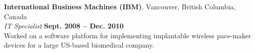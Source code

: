 \documentclass[margin,line,letterpaper]{resume}
\begin{document}
\begin{resume}
    \textbf{International Business Machines (IBM)}, Vancouver, British Columbia, Canada
\vspace{2mm}\\\vspace{1mm}%
    \textsl{IT Specialist} \hfill \textbf{Sept. 2008 -- Dec. 2010}\\
    Worked on a software platform for implementing implantable wireless pace-maker devices for a large US-based biomedical company. 






\end{resume}
\end{document}
